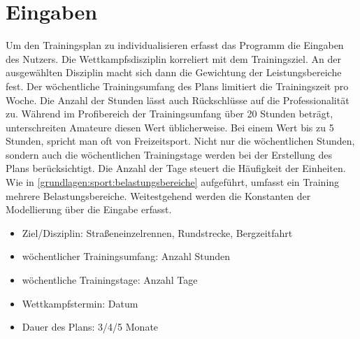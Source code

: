 \section{Eingaben}
Um den Trainingsplan zu individualisieren erfasst das Programm die Eingaben des Nutzers. Die Wettkampfsdisziplin korreliert mit dem Trainingsziel. An der ausgewählten Disziplin macht sich dann die Gewichtung der Leistungsbereiche fest. Der wöchentliche Trainingsumfang des Plans limitiert die Trainingszeit pro Woche. Die Anzahl der Stunden lässt auch Rückschlüsse auf die Professionalität zu. Während im Profibereich der Trainingsumfang über 20 Stunden beträgt, unterschreiten Amateure diesen Wert üblicherweise. Bei einem Wert bis zu 5 Stunden, spricht man oft von Freizeitsport.  \newline
Nicht nur die wöchentlichen Stunden, sondern auch die wöchentlichen Trainingstage werden bei der Erstellung des Plans berücksichtigt. Die Anzahl der Tage steuert die Häufigkeit der Einheiten.
Wie in \ref{grundlagen:sport:belastungsbereiche} aufgeführt, umfasst ein Training mehrere Belastungsbereiche. Weitestgehend werden die Konstanten der Modellierung über die Eingabe erfasst. 
\begin{itemize}
    \item Ziel/Disziplin: Straßeneinzelrennen, Rundstrecke, Bergzeitfahrt
    \item wöchentlicher Trainingsumfang: Anzahl Stunden
    \item wöchentliche Trainingstage: Anzahl Tage
    \item Wettkampfstermin: Datum
    \item Dauer des Plans: 3/4/5 Monate
\end{itemize}

